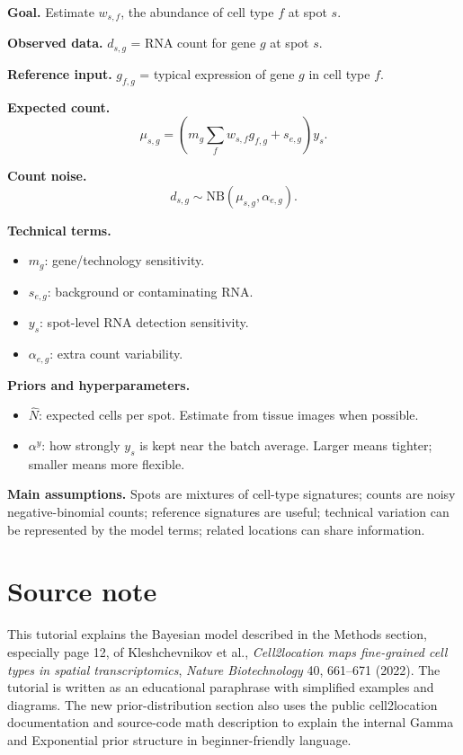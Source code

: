 \documentclass[11pt]{article}
\newcommand{\NB}{\mathrm{NB}}
\begin{document}
\begin{tcolorbox}[colback=softblue,colframe=deepblue,title=Cell2location page-12 model cheat sheet,fonttitle=\bfseries,breakable]
\textbf{Goal.} Estimate $w_{s,f}$, the abundance of cell type $f$ at spot $s$.

\textbf{Observed data.} $d_{s,g}$ = RNA count for gene $g$ at spot $s$.

\textbf{Reference input.} $g_{f,g}$ = typical expression of gene $g$ in cell type $f$.

\textbf{Expected count.}
\[
\mu_{s,g}=\left(m_g\sum_f w_{s,f}g_{f,g}+s_{e,g}\right)y_s.
\]

\textbf{Count noise.}
\[
d_{s,g}\sim \NB(\mu_{s,g},\alpha_{e,g}).
\]

\textbf{Technical terms.}
\begin{itemize}
  \item $m_g$: gene/technology sensitivity.
  \item $s_{e,g}$: background or contaminating RNA.
  \item $y_s$: spot-level RNA detection sensitivity.
  \item $\alpha_{e,g}$: extra count variability.
\end{itemize}

\textbf{Priors and hyperparameters.}
\begin{itemize}
  \item $\hat N$: expected cells per spot. Estimate from tissue images when possible.
  \item $\alpha^y$: how strongly $y_s$ is kept near the batch average. Larger means tighter; smaller means more flexible.
\end{itemize}

\textbf{Main assumptions.}
Spots are mixtures of cell-type signatures; counts are noisy negative-binomial counts; reference signatures are useful; technical variation can be represented by the model terms; related locations can share information.
\end{tcolorbox}

\section*{Source note}
This tutorial explains the Bayesian model described in the Methods section, especially page 12, of Kleshchevnikov et al., \emph{Cell2location maps fine-grained cell types in spatial transcriptomics}, \emph{Nature Biotechnology} 40, 661--671 (2022). The tutorial is written as an educational paraphrase with simplified examples and diagrams. The new prior-distribution section also uses the public cell2location documentation and source-code math description to explain the internal Gamma and Exponential prior structure in beginner-friendly language.
\end{document}
